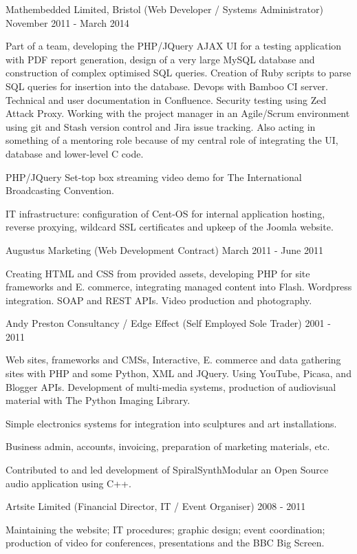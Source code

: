 \jobHeading
    {Mathembedded Limited, Bristol (Web Developer / Systems Administrator)}
    {November 2011 - March 2014}

Part of a team, developing the PHP/JQuery AJAX UI
for a testing application with PDF report generation,
design of a very large MySQL database
and construction of complex optimised SQL queries.
Creation of Ruby scripts
to parse SQL queries for insertion into the database.
Devops with Bamboo CI server.
Technical and user documentation in Confluence.
Security testing using Zed Attack Proxy.
Working with the project manager in an Agile/Scrum environment
using git and Stash version control and Jira issue tracking.
Also acting in something of a mentoring role
because of my central role of integrating the UI,
database and lower-level C code.

PHP/JQuery Set-top box streaming video demo for
The International Broadcasting Convention.

IT infrastructure:
configuration of Cent-OS for internal application hosting,
reverse proxying, wildcard SSL certificates
and upkeep of the Joomla website.

\jobHeading
    {Augustus Marketing (Web Development Contract)}
    {March 2011 - June 2011}

Creating HTML and CSS from provided assets,
developing PHP for site frameworks and E. commerce,
integrating managed content into Flash.
Wordpress integration.
SOAP and REST APIs.
Video production and photography.

\jobHeading
    {Andy Preston Consultancy / Edge Effect (Self Employed Sole Trader)}
    {2001 - 2011}

Web sites, frameworks and CMSs, Interactive, E. commerce and
data gathering sites with PHP and some Python, XML and JQuery.
Using YouTube, Picasa, and Blogger APIs.
Development of multi-media systems, production of audiovisual
material with The Python Imaging Library.

Simple electronics systems for integration into
sculptures and art installations.

Business admin, accounts, invoicing, preparation of
marketing materials, etc.

Contributed to and led development
of SpiralSynthModular an Open Source audio application using C++.

\jobHeading
    {Artsite Limited (Financial Director, IT / Event Organiser)}
    {2008 - 2011}

Maintaining the website; IT procedures; graphic design; event coordination;
production of video for conferences, presentations and the BBC Big Screen.

